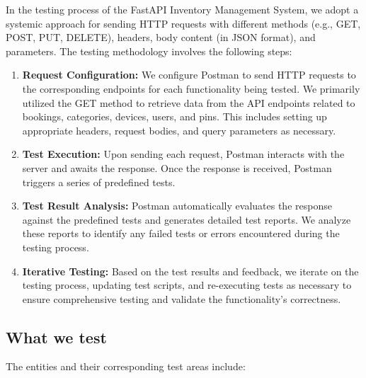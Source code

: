 In the testing process of the FastAPI Inventory Management System, we adopt a systemic approach for sending HTTP requests with different methods (e.g., GET, POST, PUT, DELETE), headers, body content (in JSON format), and parameters. The testing methodology involves the following steps:

\begin{enumerate}
    \item \textbf{Request Configuration:} We configure Postman to send HTTP requests to the corresponding endpoints for each functionality being tested. We primarily utilized the GET method to retrieve data from the API endpoints related to bookings, categories, devices, users, and pins. This includes setting up appropriate headers, request bodies, and query parameters as necessary.

    \item \textbf{Test Execution:} Upon sending each request, Postman interacts with the server and awaits the response. Once the response is received, Postman triggers a series of predefined tests.

    \item \textbf{Test Result Analysis:} Postman automatically evaluates the response against the predefined tests and generates detailed test reports. We analyze these reports to identify any failed tests or errors encountered during the testing process.

    \item \textbf{Iterative Testing:} Based on the test results and feedback, we iterate on the testing process, updating test scripts, and re-executing tests as necessary to ensure comprehensive testing and validate the functionality’s correctness.
\end{enumerate}

\subsection{What we test}

The entities and their corresponding test areas include:

